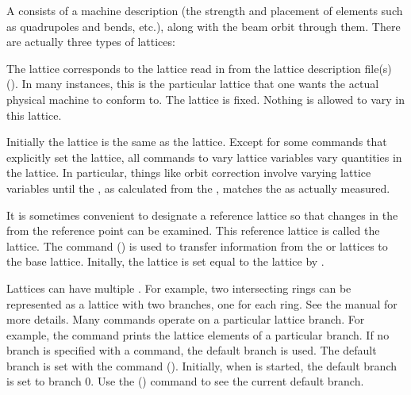 A  consists of a machine description (the strength and
placement of elements such as quadrupoles and bends, etc.), along with the
beam orbit through them. There are actually three types of lattices:
  \vspace*{-3ex}
  \begin{description}
  \item[Design Lattice] \Newline 
The  lattice corresponds to the lattice read in from the
lattice description file(s) (). In many instances, this
is the particular lattice that one wants the actual physical machine
to conform to. The  lattice is fixed. Nothing is allowed to
vary in this lattice.
  \item[Model Lattice] \Newline
Initially the  lattice is the same as the  lattice. Except for some commands
that explicitly set the  lattice, all \tao commands to vary lattice variables vary
quantities in the  lattice. In particular, things like orbit correction involve varying
 lattice variables until the , as calculated from the , matches the
 as actually measured.
  \item[Base Lattice] \Newline
It is sometimes convenient to designate a reference lattice so that
changes in the  from the reference point can be examined.
This reference lattice is called the  lattice. The 
command () is used to transfer information from the
 or  lattices to the base lattice. Initally, the  lattice is
set equal to the  lattice by \tao.
  \end{description}

Lattices can have multiple . For example, two
intersecting rings can be represented as a lattice with two branches,
one for each ring. See the \bmad manual for more details. Many \tao
commands operate on a particular lattice branch. For example, the
 command prints the lattice elements of a particular
branch. If no branch is specified with a command, the default branch
is used. The default branch is set with the 
command (). Initially, when \tao is started, the default
branch is set to branch 0. Use the  ()
command to see the current default branch.

